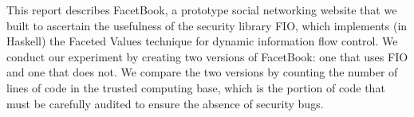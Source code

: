 This report describes FacetBook, a prototype social networking website that we built to ascertain the usefulness of the security library FIO, which implements (in Haskell) the Faceted Values technique for dynamic information flow control. We conduct our experiment by creating two versions of FacetBook: one that uses FIO and one that does not. We compare the two versions by counting the number of lines of code in the trusted computing base, which is the portion of code that must be carefully audited to ensure the absence of security bugs.

